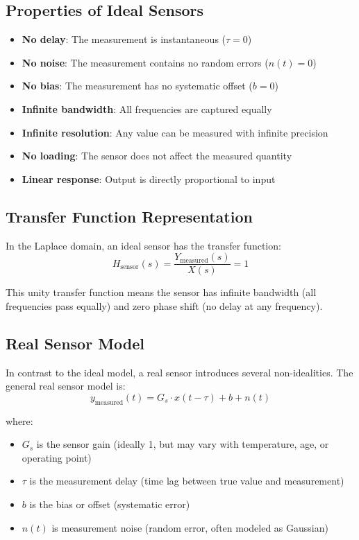 \subsection{Properties of Ideal Sensors}

\begin{itemize}
    \item \textbf{No delay}: The measurement is instantaneous ($\tau = 0$)
    \item \textbf{No noise}: The measurement contains no random errors ($n(t) = 0$)
    \item \textbf{No bias}: The measurement has no systematic offset ($b = 0$)
    \item \textbf{Infinite bandwidth}: All frequencies are captured equally
    \item \textbf{Infinite resolution}: Any value can be measured with infinite precision
    \item \textbf{No loading}: The sensor does not affect the measured quantity
    \item \textbf{Linear response}: Output is directly proportional to input
\end{itemize}

\subsection{Transfer Function Representation}

In the Laplace domain, an ideal sensor has the transfer function:
\begin{equation}
H_{\text{sensor}}(s) = \frac{Y_{\text{measured}}(s)}{X(s)} = 1
\label{eq:ideal_sensor_tf}
\end{equation}

This unity transfer function means the sensor has infinite bandwidth (all frequencies pass equally) and zero phase shift (no delay at any frequency).

\subsection{Real Sensor Model}

In contrast to the ideal model, a real sensor introduces several non-idealities. The general real sensor model is:
\begin{equation}
\boxed{y_{\text{measured}}(t) = G_s \cdot x(t - \tau) + b + n(t)}
\label{eq:real_sensor}
\end{equation}

where:
\begin{itemize}
    \item $G_s$ is the sensor gain (ideally 1, but may vary with temperature, age, or operating point)
    \item $\tau$ is the measurement delay (time lag between true value and measurement)
    \item $b$ is the bias or offset (systematic error)
    \item $n(t)$ is measurement noise (random error, often modeled as Gaussian)
\end{itemize}


